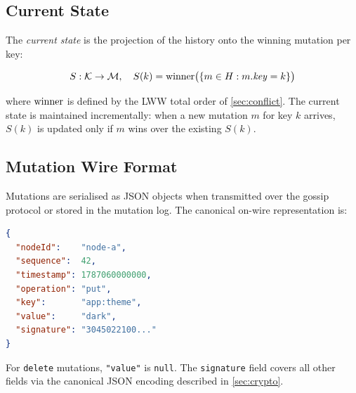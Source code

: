 \subsection{Current State}

The \emph{current state} is the projection of the history onto the winning
mutation per key:

\[
  S : \mathcal{K} \to \mathcal{M},\quad S(k) = \mathrm{winner}\bigl(\{m \in H : m.\mathit{key} = k\}\bigr)
\]

where $\mathrm{winner}$ is defined by the LWW total order of \cref{sec:conflict}.
The current state is maintained incrementally: when a new mutation $m$ for key
$k$ arrives, $S(k)$ is updated only if $m$ wins over the existing $S(k)$.

\subsection{Mutation Wire Format}

Mutations are serialised as JSON objects when transmitted over the gossip
protocol or stored in the mutation log. The canonical on-wire representation is:

\begin{lstlisting}[language=json, caption={Mutation JSON representation.}]
{
  "nodeId":    "node-a",
  "sequence":  42,
  "timestamp": 1787060000000,
  "operation": "put",
  "key":       "app:theme",
  "value":     "dark",
  "signature": "3045022100..."
}
\end{lstlisting}

\noindent For \texttt{delete} mutations, \texttt{"value"} is \texttt{null}.
The \texttt{signature} field covers all other fields via the canonical JSON
encoding described in \cref{sec:crypto}.
